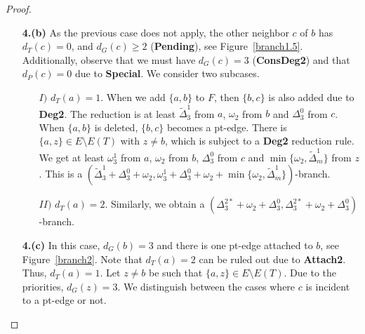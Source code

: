 \documentclass{llncs}
\begin{document}
{\begin{proof}
\begin{enumerate}
\item[\bf 4.(b)] As the previous case does not apply, the other neighbor $c$ of $b$ has $d_T(c)=0$, and $d_G(c)\ge 2$ ({\bf Pending}), see Figure~\ref{branch1.5}. Additionally, observe that we must have $d_G(c)=3$ ({\bf ConsDeg2}) and that $d_P(c)=0$ due to {\bf Special}. We consider two subcases.
\begin{itemize}
\item[$I)$] $d_T(a)=1$. When we add $\{a,b\}$ to $F$, then $\{b,c\}$ is also added due to {\bf Deg2}. The reduction is at least $\tilde \Delta_3^1$
from $a$, $\omega_2$
 from $b$ and $\Delta_3^0$ from $c$. When $\{a,b\}$ is deleted, $\{b,c\}$ becomes a pt-edge. There is $\{a,z\} \in E \setminus E(T)$ with $z \neq b$,
which is subject to a {\bf Deg2} reduction rule. We get at least $\omega_3^1$ from $a$, $\omega_2$ from $b$, $\Delta_3^0$ from $c$ and
$\min\{\omega_2,\tilde \Delta_m^1\}$ from $z$. This is a $(\tilde \Delta_3^1+\Delta_3^0+\omega_2,\omega_3^1+\Delta_3^0+\omega_2+\min\{\omega_2,\tilde
\Delta_m^1\})$-branch. 
\item[$II)$] $d_T(a)=2$. Similarly, we obtain a $(\Delta_3^{2\ast}+\omega_2+\Delta_3^0,\Delta_3^{2\ast}+\omega_2+\Delta_3^0)$-branch.
\end{itemize}
\item[\bf 4.(c)] In this case, $d_G(b)=3$ and there is one  pt-edge attached to $b$, see Figure~\ref{branch2}. 
Note that $d_T(a)=2$ can be ruled out due to {\bf Attach2}. Thus, $d_T(a)=1$. Let $z \neq b$ be such that $\{a,z\} \in E \setminus E(T)$. Due to the priorities, $d_G(z)=3$.  We distinguish between the cases where $c$ is incident to a pt-edge or not.
\end{enumerate}
\end{proof}}
\end{document}
